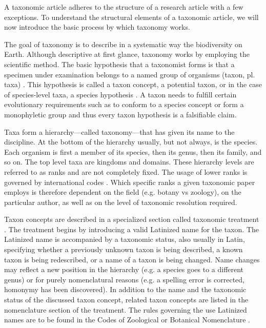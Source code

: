 \documentclass{bmcart}
\begin{document}
A taxonomic article adheres to the structure of a research article with a few exceptions. To understand the structural elements of a taxonomic article, we will now introduce the basic process by which taxonomy works.

The goal of taxonomy is to describe in a systematic way the biodiversity on Earth. Although descriptive at first glance, taxonomy works by employing the scientific method. The basic hypothesis that a taxonomist forms is that a specimen under examination belongs to a named group of organisms (taxon, pl. taxa) \cite{deans_time_2012}. This hypothesis is called a taxon concept, a potential taxon, or in the case of species-level taxa, a species hypothesis \cite{Berendsohn1995}. A taxon needs to fulfill certain evolutionary requirements such as to conform to a species concept or form a monophyletic group \cite{mallet_species_2001} and thus every taxon hypothesis is a falsifiable claim.

Taxa form a hierarchy---called taxonomy---that has given its name to the discipline. At the bottom of the hierarchy usually, but not always, is the species. Each organism is first a member of its species, then its genus, then its family, and so on. The top level taxa are kingdoms and domains. These hierarchy levels are referred to as ranks and are not completely fixed. The usage of lower ranks is governed by international codes \cite{W.D.L.Ride2012, McNeill2011}. Which specific ranks a given taxonomic paper employs is therefore dependent on the field (e.g. botany vs zoology), on the particular author, as well as on the level of taxonomic resolution required.

Taxon concepts are described in a specialized section called taxonomic treatment \cite{catapano_taxpub:_2010}. The treatment begins by introducing a valid Latinized name for the taxon. The Latinized name is accompanied by a taxonomic status, also usually in Latin, specifying whether a previously unknown taxon is being described, a known taxon is being redescribed, or a name of a taxon is being changed. Name changes may reflect a new position in the hierarchy (e.g. a species goes to a different genus) or for purely nomenclatural reasons (e.g. a spelling error is corrected, homonymy has been discovered). In addition to the name and the taxonomic status of the discussed taxon concept, related taxon concepts are listed in the nomenclature section of the treatment. The rules governing the use Latinized names are to be found in the Codes of Zoological or Botanical Nomenclature \cite{W.D.L.Ride2012,McNeill2011}.
\end{document}
